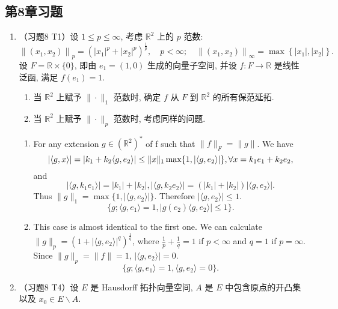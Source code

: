 \subsection{第8章习题}
\begin{enumerate}
  \item （习题8 T1）设 $1 \leqslant p \leqslant \infty$, 考虑 $\mathbb{R}^{2}$ 上的 $p$ 范数:
    \[
        \left\|\left(x_{1}, x_{2}\right)\right\|_{p}=\left(\left|x_{1}\right|^{p}+\left|x_{2}\right|^{p}\right)^{\frac{1}{p}}, \quad p<\infty ; \quad\left\|\left(x_{1}, x_{2}\right)\right\|_{\infty}=\max \left\{\left|x_{1}\right|,\left|x_{2}\right|\right\} .
    \]
    设 $F=\mathbb{R} \times\{0\}$, 即由 $e_{1}=(1,0)$ 生成的向量子空间, 并设 $f: F \rightarrow \mathbb{R}$ 是线性 泛函, 满足 $f\left(e_{1}\right)=1$.
    \begin{enumerate}
        \item 当 $\mathbb{R}^{2}$ 上赋予 $\|\cdot\|_{1}$ 范数时, 确定 $f$ 从 $F$ 到 $\mathbb{R}^{2}$ 的所有保范延拓.
        \item 当 $\mathbb{R}^{2}$ 上赋予 $\|\cdot\|_{p}$ 范数时, 考虑同样的问题.
    \end{enumerate}
    \begin{answer}
      \begin{enumerate}
        \item For any extension $g\in (\mathbb R^2)^*$ of f such that $\|f\|_F = \|g\|$. We have
        \[
            |\langle g,x\rangle| =
            |k_1 + k_2\langle g,e_2\rangle|\leq
            \|x\|_1\max\{1, |\langle g,e_2\rangle|\}, \forall x = k_1e_1 + k_2e_2,
        \]
        and
        \[
            |\langle g, k_1e_1\rangle| = |k_1| + |k_2|, |\langle g, k_2e_2\rangle| = (|k_1| + |k_2|)|\langle g, e_2\rangle|.
        \]
        Thus $\|g\|_1 = \max\{1, |\langle g, e_2\rangle|\}$. Therefore $|\langle g, e_2\rangle| \leq 1$.
        \[\{g; \langle g, e_1\rangle = 1, |g(e_2)\langle g, e_2\rangle|\leq 1\}. \]
        \item This case is almost identical to the first one. We can calculate $\|g\|_p = (1 + |\langle g, e_2\rangle|^q)^{\frac1q}$, where $\frac1p + \frac1q = 1$ if $p < \infty$ and $q = 1$ if $p = \infty$. Since $\|g\|_p = \|f\| = 1$, $|\langle g, e_2\rangle| = 0$.
        \[\{g; \langle g, e_1\rangle = 1, \langle g, e_2\rangle=0\}. \]
      \end{enumerate}
    \end{answer}
  \item （习题8 T4）设 $E$ 是 Hausdorff 拓扑向量空间, $A$ 是 $E$ 中包含原点的开凸集以及 $x_{0} \in E \backslash A$.

\end{enumerate}
